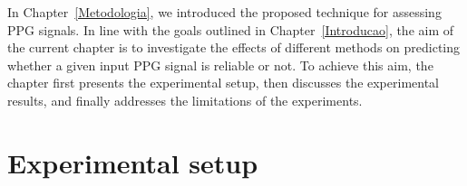 
%



In Chapter~\ref{Metodologia}, we introduced the proposed technique for assessing \gls{PPG} signals. In line with the goals outlined in Chapter~\ref{Introducao}, the aim of the current chapter is to investigate the effects of different methods on predicting whether a given input \gls{PPG} signal is reliable or not. To achieve this aim, the chapter first presents the experimental setup, then discusses the experimental results, and finally addresses the limitations of the experiments.



\section{Experimental setup}

